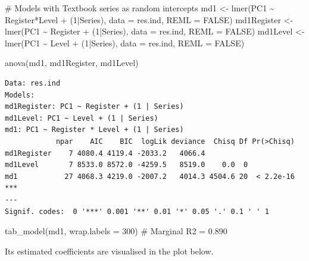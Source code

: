 \documentclass[
  letterpaper,
  DIV=11,
  numbers=noendperiod]{scrreprt}
\newenvironment{Shaded}{\begin{snugshade}}{\end{snugshade}}
\newcommand{\AttributeTok}[1]{\textcolor[rgb]{0.40,0.45,0.13}{#1}}
\newcommand{\CommentTok}[1]{\textcolor[rgb]{0.37,0.37,0.37}{#1}}
\newcommand{\ConstantTok}[1]{\textcolor[rgb]{0.56,0.35,0.01}{#1}}
\newcommand{\DecValTok}[1]{\textcolor[rgb]{0.68,0.00,0.00}{#1}}
\newcommand{\FunctionTok}[1]{\textcolor[rgb]{0.28,0.35,0.67}{#1}}
\newcommand{\NormalTok}[1]{\textcolor[rgb]{0.00,0.23,0.31}{#1}}
\newcommand{\OtherTok}[1]{\textcolor[rgb]{0.00,0.23,0.31}{#1}}
\newcommand{\SpecialCharTok}[1]{\textcolor[rgb]{0.37,0.37,0.37}{#1}}
\begin{document}
\begin{Shaded}
\begin{Highlighting}[]
\CommentTok{\# Models with Textbook series as random intercepts}
\NormalTok{md1 }\OtherTok{\textless{}{-}} \FunctionTok{lmer}\NormalTok{(PC1 }\SpecialCharTok{\textasciitilde{}}\NormalTok{ Register}\SpecialCharTok{*}\NormalTok{Level }\SpecialCharTok{+}\NormalTok{ (}\DecValTok{1}\SpecialCharTok{|}\NormalTok{Series), }\AttributeTok{data =}\NormalTok{ res.ind, }\AttributeTok{REML =} \ConstantTok{FALSE}\NormalTok{)}
\NormalTok{md1Register }\OtherTok{\textless{}{-}} \FunctionTok{lmer}\NormalTok{(PC1 }\SpecialCharTok{\textasciitilde{}}\NormalTok{ Register }\SpecialCharTok{+}\NormalTok{ (}\DecValTok{1}\SpecialCharTok{|}\NormalTok{Series), }\AttributeTok{data =}\NormalTok{ res.ind, }\AttributeTok{REML =} \ConstantTok{FALSE}\NormalTok{)}
\NormalTok{md1Level }\OtherTok{\textless{}{-}} \FunctionTok{lmer}\NormalTok{(PC1 }\SpecialCharTok{\textasciitilde{}}\NormalTok{ Level }\SpecialCharTok{+}\NormalTok{ (}\DecValTok{1}\SpecialCharTok{|}\NormalTok{Series), }\AttributeTok{data =}\NormalTok{ res.ind, }\AttributeTok{REML =} \ConstantTok{FALSE}\NormalTok{)}

\FunctionTok{anova}\NormalTok{(md1, md1Register, md1Level)}
\end{Highlighting}
\end{Shaded}

\begin{verbatim}
Data: res.ind
Models:
md1Register: PC1 ~ Register + (1 | Series)
md1Level: PC1 ~ Level + (1 | Series)
md1: PC1 ~ Register * Level + (1 | Series)
            npar    AIC    BIC  logLik deviance  Chisq Df Pr(>Chisq)    
md1Register    7 4080.4 4119.4 -2033.2   4066.4                         
md1Level       7 8533.0 8572.0 -4259.5   8519.0    0.0  0               
md1           27 4068.3 4219.0 -2007.2   4014.3 4504.6 20  < 2.2e-16 ***
---
Signif. codes:  0 '***' 0.001 '**' 0.01 '*' 0.05 '.' 0.1 ' ' 1
\end{verbatim}

\begin{Shaded}
\begin{Highlighting}[]
\FunctionTok{tab\_model}\NormalTok{(md1, }\AttributeTok{wrap.labels =} \DecValTok{300}\NormalTok{) }\CommentTok{\# Marginal R2 = 0.890}
\end{Highlighting}
\end{Shaded}

Its estimated coefficients are visualised in the plot below.
\end{document}
